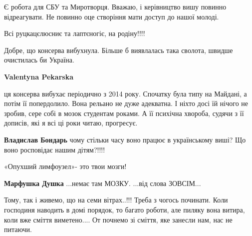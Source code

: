 \begin{itemize}
Є робота для СБУ та Миротворця. Вважаю, і керівництво вишу повинно
відреагувати. Не повинно оце створіння мати доступ до нашої молоді.

Всі руцкацєлюсниє та лаптєногіє, на родіну!!!!

Добре, що консерва вибухнула. Більше б виявлалась така сволота, швидше
очистилась би Україна.

\begin{itemize}
 
\textbf{Valentyna Pekarska} 

ця консерва вибухає періодично з 2014 року. Спочатку була типу на Майдані, а
потім її попердолило. Вона рельано не дуже адекватна. І ніхто досі їй нічого не
зробив, сере собі в мозок студентам роками. А її психічна хвороба, судячи з її
дописів, які я всі ці роки читаю, прогресує.

 
\textbf{Владислав Бондарь} чому стільки часу воно працює в українському виші? Що воно росповідає нашим дітям?!!!!
\end{itemize}

 
«Опухший лимфоузел»- это твои мозги!


\begin{itemize}
 
\textbf{Марфушка Душка }...немає там МОЗКУ.
...від слова ЗОВСІМ...
\end{itemize}

 
Тому, так і живемо, що на семи вітрах..!!! Треба з чогось починати. Коли господиня наводить в домі порядок, то багато роботи, але пиляку вона витира, коли вже сміття виметено.... От почнемо зі сміття, яке занесли нам, нас не питаючи.


\end{itemize}
